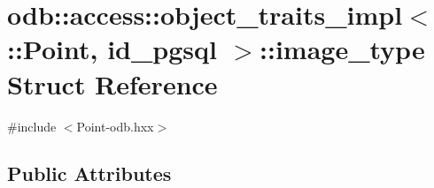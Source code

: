 \hypertarget{structodb_1_1access_1_1object__traits__impl_3_01_1_1_point_00_01id__pgsql_01_4_1_1image__type}{}\section{odb\+:\+:access\+:\+:object\+\_\+traits\+\_\+impl$<$ \+:\+:Point, id\+\_\+pgsql $>$\+:\+:image\+\_\+type Struct Reference}
\label{structodb_1_1access_1_1object__traits__impl_3_01_1_1_point_00_01id__pgsql_01_4_1_1image__type}


{\ttfamily \#include $<$Point-\/odb.\+hxx$>$}

\subsection*{Public Attributes}
